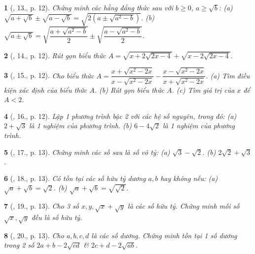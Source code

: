 \documentclass{article}
\newtheorem{baitoan}{}
\begin{document}
\begin{baitoan}[\cite{Binh_Toan_9_tap_1}, 13., p. 12]
	Chứng minh các hằng đẳng thức sau với $b\ge0$, $a\ge\sqrt{b}$: (a) $\sqrt{a + \sqrt{b}}\pm\sqrt{a - \sqrt{b}} = \sqrt{2(a\pm\sqrt{a^2 - b})}$. (b) $\sqrt{a\pm\sqrt{b}} = \sqrt{\dfrac{a + \sqrt{a^2 - b}}{2}}\pm\sqrt{\dfrac{a - \sqrt{a^2 - b}}{2}}$.
\end{baitoan}

\begin{baitoan}[\cite{Binh_Toan_9_tap_1}, 14., p. 12]
	Rút gọn biểu thức $A = \sqrt{x + 2\sqrt{2x - 4}} + \sqrt{x - 2\sqrt{2x - 4}}$.
\end{baitoan}

\begin{baitoan}[\cite{Binh_Toan_9_tap_1}, 15., p. 12]
	Cho biểu thức $A = \dfrac{x + \sqrt{x^2 - 2x}}{x - \sqrt{x^2 - 2x}} - \dfrac{x - \sqrt{x^2 - 2x}}{x + \sqrt{x^2 - 2x}}$. (a) Tìm điều kiện xác định của biểu thức $A$. (b) Rút gọn biểu thức $A$. (c) Tìm giá trị của $x$ để $A < 2$.
\end{baitoan}

\begin{baitoan}[\cite{Binh_Toan_9_tap_1}, 16., p. 12]
	Lập 1 phương trình bậc 2 với các hệ số nguyên, trong đó: (a) $2 + \sqrt{3}$ là 1 nghiệm của phương trình. (b) $6 - 4\sqrt{2}$ là 1 nghiệm của phương trình.
\end{baitoan}

\begin{baitoan}[\cite{Binh_Toan_9_tap_1}, 17., p. 13]
	Chứng minh các số sau là số vô tỷ: (a) $\sqrt{3} - \sqrt{2}$. (b) $2\sqrt{2} + \sqrt{3}$.
\end{baitoan}

\begin{baitoan}[\cite{Binh_Toan_9_tap_1}, 18., p. 13]
	Có tồn tại các số hữu tỷ dương $a,b$ hay không nếu: (a) $\sqrt{a} + \sqrt{b} = \sqrt{2}$. (b) $\sqrt{a} + \sqrt{b} = \sqrt{\sqrt{2}}$.
\end{baitoan}

\begin{baitoan}[\cite{Binh_Toan_9_tap_1}, 19., p. 13]
	Cho 3 số $x,y,\sqrt{x} + \sqrt{y}$ là các số hữu tỷ. Chứng minh mỗi số $\sqrt{x},\sqrt{y}$ đều là số hữu tỷ.
\end{baitoan}

\begin{baitoan}[\cite{Binh_Toan_9_tap_1}, 20., p. 13]
	Cho $a,b,c,d$ là các số dương. Chứng minh tồn tại 1 số dương trong 2 số $2a + b - 2\sqrt{cd}$ \& $2c + d - 2\sqrt{ab}$.
\end{baitoan}
\end{document}
